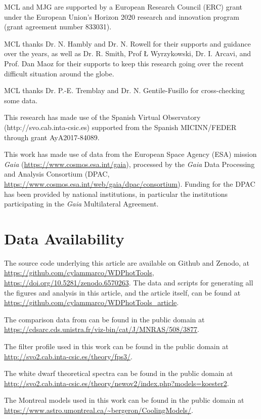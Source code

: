 \documentclass[fleqn,usenatbib]{rasti}
\begin{document}
MCL and MJG are supported by a European Research Council (ERC) grant under the European
Union’s Horizon 2020 research and innovation program (grant agreement number
833031).

MCL thanks Dr. N. Hambly and Dr. N. Rowell for their supports and guidance over
the years, as well as Dr. R. Smith, Prof \L{} Wyrzykowski, Dr. I. Arcavi,
and Prof. Dan Maoz for their supports to keep this research going over the
recent difficult situation around the globe.

MCL thanks Dr. P.-E. Tremblay and Dr. N. Gentile-Fusillo for cross-checking
some data.

This research has made use of the Spanish Virtual Observatory
(http://svo.cab.inta-csic.es) supported from the Spanish MICINN/FEDER through
grant AyA2017-84089.

This work has made use of data from the European Space Agency (ESA) mission
{\it Gaia} (\url{https://www.cosmos.esa.int/gaia}), processed by the {\it Gaia}
Data Processing and Analysis Consortium (DPAC,
\url{https://www.cosmos.esa.int/web/gaia/dpac/consortium}). Funding for the DPAC
has been provided by national institutions, in particular the institutions
participating in the {\it Gaia} Multilateral Agreement.

\section*{Data Availability}
The source code underlying this article are available on Github and Zenodo, at \url{https://github.com/cylammarco/WDPhotTools}, \url{https://doi.org/10.5281/zenodo.6570263}. The data and scripts for generating all the figures and analysis in this article, and the article itself, can be found at \url{https://github.com/cylammarco/WDPhotTools_article}.

The comparison data from \citet{2021MNRAS.508.3877G} can be found in the public domain at \url{https://cdsarc.cds.unistra.fr/viz-bin/cat/J/MNRAS/508/3877}.

The filter profile used in this work can be found in the public domain at \url{http://svo2.cab.inta-csic.es/theory/fps3/}.

The white dwarf theoretical spectra can be found in the public domain at \url{http://svo2.cab.inta-csic.es/theory/newov2/index.php?models=koester2}.

The Montreal models used in this work can be found in the public domain at \url{https://www.astro.umontreal.ca/~bergeron/CoolingModels/}.
\end{document}
